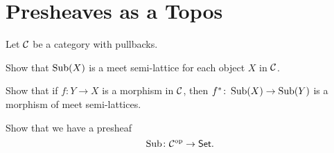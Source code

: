 \section{Presheaves as a Topos}

\begin{exercise}{9.2}
    Let $\mathcal{C}$ be a category with pullbacks. 
    \begin{exercises}
        \item Show that $\operatorname{Sub}(X)$ is a meet semi-lattice for each object $X$ in $\mathcal{C}$.
        \item Show that if $f\colon Y\to X$ is a morphism in $\mathcal{C}$, then $f^*\colon\operatorname{Sub}(X)\to\operatorname{Sub}(Y)$ is a morphism of meet semi-lattices.
        \item Show that we have a presheaf
            \[ \operatorname{Sub}\colon\mathcal{C}^{\text{op}}\to\normalfont\mathsf{Set}.\]
    \end{exercises}
\end{exercise}
